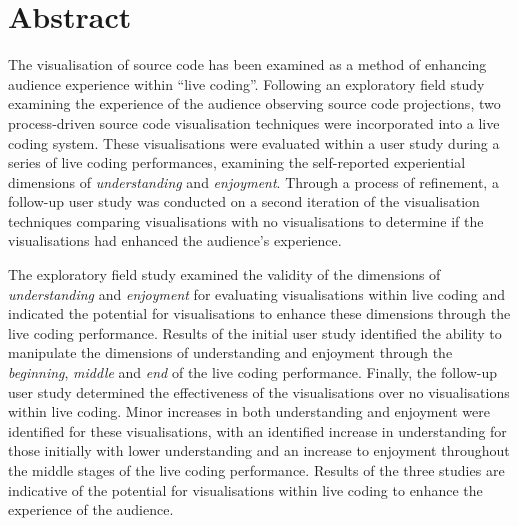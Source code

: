 
\chapter*{Abstract}
\label{chap:abstract}

The visualisation of source code has been examined as a method of enhancing audience experience within ``live coding''. Following an exploratory field study examining the experience of the audience observing source code projections, two process-driven source code visualisation techniques were incorporated into a live coding system. These visualisations were evaluated within a user study during a series of live coding performances, examining the self-reported experiential dimensions of \emph{understanding} and \emph{enjoyment}. Through a process of refinement, a follow-up user study was conducted on a second iteration of the visualisation techniques comparing visualisations with no visualisations to determine if the visualisations had enhanced the audience's experience.

The exploratory field study examined the validity of the dimensions of \emph{understanding} and \emph{enjoyment} for evaluating visualisations within live coding and indicated the potential for visualisations to enhance these dimensions through the live coding performance. Results of the initial user study identified the ability to manipulate the dimensions of understanding and enjoyment through the \emph{beginning}, \emph{middle} and \emph{end} of the live coding performance. Finally, the follow-up user study determined the effectiveness of the visualisations over no visualisations within live coding. Minor increases in both understanding and enjoyment were identified for these visualisations, with an identified increase in understanding for those initially with lower understanding and an increase to enjoyment throughout the middle stages of the live coding performance. Results of the three studies are indicative of the potential for visualisations within live coding to enhance the experience of the audience. 

